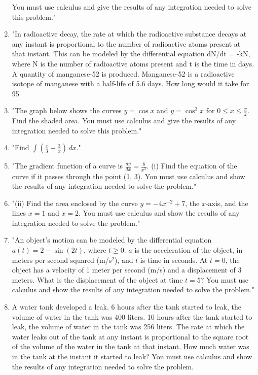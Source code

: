 \documentclass{article}
\begin{document}
\begin{enumerate}
You must use calculus and give the results of any integration needed to solve this problem."
\vspace{3cm}
\item "In radioactive decay, the rate at which the radioactive substance decays at any instant is proportional to the number of radioactive atoms present at that instant. This can be modeled by the differential equation dN/dt = -kN, where N is the number of radioactive atoms present and t is the time in days. A quantity of manganese-52 is produced. Manganese-52 is a radioactive isotope of manganese with a half-life of 5.6 days. How long would it take for 95%
\vspace{3cm}
\item "The graph below shows the curves \( y = \cos x \) and \( y = \cos^3 x \) for \( 0 \leq x \leq \frac{\pi}{2} \). Find the shaded area. You must use calculus and give the results of any integration needed to solve this problem."
\vspace{3cm}
\item "Find \(\int \left( \frac{x}{3} + \frac{3}{x} \right) \, dx\)."
\vspace{3cm}
\item "The gradient function of a curve is \( \frac{dy}{dx} = \frac{8}{x^3} \). (i) Find the equation of the curve if it passes through the point (1, 3). You must use calculus and show the results of any integration needed to solve the problem."
\vspace{3cm}
\item "(ii) Find the area enclosed by the curve \( y = -4x^{-2} + 7 \), the \(x\)-axis, and the lines \(x = 1\) and \(x = 2\). You must use calculus and show the results of any integration needed to solve the problem."
\vspace{3cm}
\item "An object's motion can be modeled by the differential equation \( a(t) = 2 - \sin(2t) \), where \( t \geq 0 \). \( a \) is the acceleration of the object, in meters per second squared (m/s\(^2\)), and \( t \) is time in seconds. At \( t = 0 \), the object has a velocity of 1 meter per second (m/s) and a displacement of 3 meters. What is the displacement of the object at time \( t = 5 \)? You must use calculus and show the results of any integration needed to solve the problem."
\vspace{3cm}
\item A water tank developed a leak. 6 hours after the tank started to leak, the volume of water in the tank was 400 liters. 10 hours after the tank started to leak, the volume of water in the tank was 256 liters. The rate at which the water leaks out of the tank at any instant is proportional to the square root of the volume of the water in the tank at that instant. How much water was in the tank at the instant it started to leak? You must use calculus and show the results of any integration needed to solve the problem.

\end{enumerate}
\end{document}
